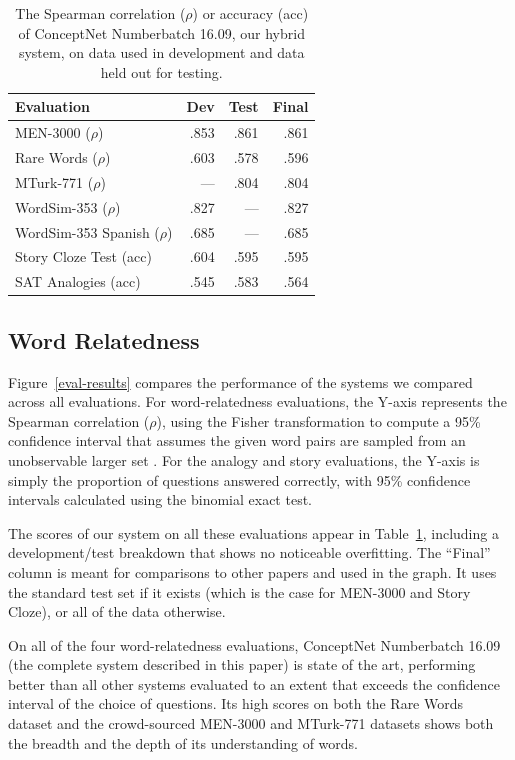 \documentclass[letterpaper]{article}
\begin{document}
\begin{table}[t]
\centering
\begin{tabular}{lrrr}
\bf Evaluation     & \bf Dev & \bf Test & \bf Final \\
\hline
MEN-3000 ($\rho$)              & .853 & .861 & .861 \\
Rare Words ($\rho$)            & .603 & .578 & .596 \\
MTurk-771 ($\rho$)             &  --- & .804 & .804 \\
WordSim-353 ($\rho$)           & .827 &  --- & .827 \\
WordSim-353 Spanish ($\rho$)   & .685 &  --- & .685 \\
Story Cloze Test (acc)         & .604 & .595 & .595 \\
SAT Analogies (acc)            & .545 & .583 & .564
\end{tabular}
\caption{The Spearman correlation ($\rho$) or accuracy (acc) of ConceptNet Numberbatch 16.09, our hybrid system,
on data used in development and data held out for testing.}
\label{eval-table}
\end{table}

\subsection{Word Relatedness}

Figure~\ref{eval-results} compares the performance of the systems we compared
across all evaluations. For word-relatedness evaluations, the Y-axis represents
the Spearman correlation ($\rho$), using the Fisher transformation to compute a
95\% confidence interval that assumes the given word pairs are sampled from an
unobservable larger set \cite{bonett2000sample}. For the analogy and story evaluations,
the Y-axis is simply the proportion of questions answered correctly, with 95\%
confidence intervals calculated using the binomial exact test.

The scores of our system on all these evaluations appear in
Table~\ref{eval-table}, including a development/test breakdown that shows no
noticeable overfitting. The ``Final'' column is meant for comparisons to other
papers and used in the graph. It uses the standard test set if it exists (which
is the case for MEN-3000 and Story Cloze), or all of the data
otherwise.

On all of the four word-relatedness evaluations, ConceptNet Numberbatch 16.09
(the complete system described in this paper) is state of the art, performing
better than all other systems evaluated to an extent that exceeds the
confidence interval of the choice of questions. Its high scores on both the
Rare Words dataset and the crowd-sourced MEN-3000 and MTurk-771 datasets shows
both the breadth and the depth of its understanding of words.
\end{document}
